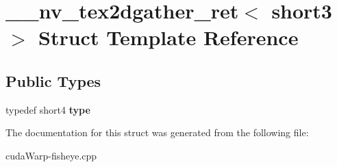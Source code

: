 \hypertarget{struct____nv__tex2dgather__ret_3_01short3_01_4}{}\section{\+\_\+\+\_\+nv\+\_\+tex2dgather\+\_\+ret$<$ short3 $>$ Struct Template Reference}
\label{struct____nv__tex2dgather__ret_3_01short3_01_4}
\subsection*{Public Types}
\begin{DoxyCompactItemize}
\item 
typedef short4 {\bfseries type}\hypertarget{struct____nv__tex2dgather__ret_3_01short3_01_4_a81c867ce2ca2e5a9cf4b599232540cfa}{}\label{struct____nv__tex2dgather__ret_3_01short3_01_4_a81c867ce2ca2e5a9cf4b599232540cfa}

\end{DoxyCompactItemize}


The documentation for this struct was generated from the following file\+:\begin{DoxyCompactItemize}
\item 
cuda\+Warp-\/fisheye.\+cpp\end{DoxyCompactItemize}
